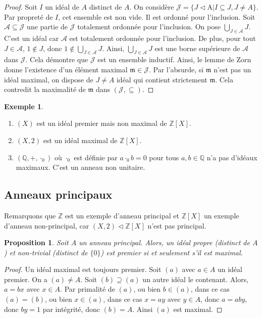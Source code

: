 \documentclass{article}
\newcommand{\Z}{\mathbb{Z}}
\newcommand{\Q}{\mathbb{Q}}
\newcommand{\maxid}{\mathfrak{m}}
\newcommand{\Jcat}{\mathcal{J}}
\newcommand{\Acat}{\mathcal{A}}
\renewcommand{\subset}{\subseteq}
\theoremstyle{plain}
\newtheorem{proposition}[theorem]{Proposition}
\theoremstyle{definition}
\newtheorem{example}[theorem]{Exemple}
\theoremstyle{remark}
\begin{document}
\begin{proof}
    Soit $I$ un idéal de $A$ distinct de $A$. On considère $\Jcat = \{J \lhd $A$ \mid I \subseteq J, J \ne A\}$. Par propreté de $I$, cet ensemble est non vide. Il est ordonné pour l'inclusion. Soit $\Acat \subset \Jcat$ une partie de $\Jcat$ totalement ordonnée pour l'inclusion. On pose $\bigcup\limits_{J \in \Acat} J$. C'est un idéal car $\Acat$ est totalement ordonnée pour l'inclusion. De plus, pour tout $J \in \Acat$, $1 \notin J$, donc $1 \notin \bigcup\limits_{J \in \Acat} J$. Ainsi, $\bigcup\limits_{J \in \Acat} J$ est une borne supérieure de $\Acat$ dans $\Jcat$. Cela démontre que $\Jcat$ est un ensemble inductif. Ainsi, le lemme de Zorn donne l'existence d'un élément maximal $\maxid \in \Jcat$. Par l'absurde, si $\maxid$ n'est pas un idéal maximal, on dispose de $J \ne A$ idéal qui contient strictement $\maxid$. Cela contredit la maximalité de $\maxid$ dans $(\Jcat,\subseteq)$.
\end{proof}

\begin{example} \leavevmode
    \begin{enumerate}
        \item $(X)$ est un idéal premier mais non maximal de $\Z[X]$.
        \item $(X,2)$ est un idéal maximal de $\Z[X]$.
        \item $(\Q,+,\cdot_0)$ où $\cdot_0$ est définie par $a\cdot_0 b = 0$ pour tous $a,b \in \Q$ n'a pas d'idéaux maximaux. C'est un anneau non unitaire.
    \end{enumerate}
\end{example}

\subsection{Anneaux principaux}

Remarquons que $\Z$ est un exemple d'anneau principal et $\Z[X]$ un exemple d'anneau non-principal, car $(X,2) \lhd \Z[X]$ n'est pas principal.

\begin{proposition}
    Soit $A$ un anneau principal. Alors, un idéal propre (distinct de $A$) et non-trivial (distinct de $\{0\}$) est premier si et seulement s'il est maximal.
\end{proposition}

\begin{proof}
    Un idéal maximal est toujours premier. Soit $(a)$ avec $a \in A$ un idéal premier. On a $(a) \ne A$. Soit $(b) \supseteq (a)$ un autre idéal le contenant. Alors, $a = bx$ avec $x \in A$. Par primalité de $(a)$, ou bien $b \in (a)$, dans ce cas $(a) = (b)$, ou bien $x \in (a)$, dans ce cas $x = ay$ avec $y \in A$, donc $a = aby$, donc $by = 1$ par intégrité, donc $(b) = A$. Ainsi $(a)$ est maximal.
\end{proof}
\end{document}
